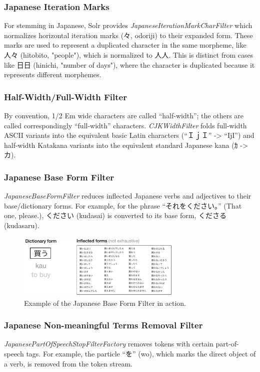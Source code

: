 \documentclass[11pt]{article}
\begin{document}
\subsubsection{Japanese Iteration Marks}
For stemming in Japanese, Solr provides \textit{JapaneseIterationMarkCharFilter} which normalizes horizontal iteration marks (々, odoriji) to their expanded form. These marks are used to represent a duplicated character in the same morpheme, like 人々 (hitobito, "people"), which is normalized to 人人. This is distinct from cases like 日日 (hinichi, "number of days"), where the character is duplicated because it represents different morphemes.

\subsubsection{Half-Width/Full-Width Filter}
By convention, 1/2 Em wide characters are called “half-width”; the others are called correspondingly “full-width” characters. \textit{CJKWidthFilter} folds full-width ASCII variants into the equivalent basic Latin characters (“ＩｊＩ” -> “IjI”) and half-width Katakana variants into the equivalent standard Japanese kana (ｶ -> カ).

\subsubsection{Japanese Base Form Filter}
\textit{JapaneseBaseFormFilter} reduces inflected Japanese verbs and adjectives to their base/dictionary forms. For example, for the phrase “それをください。” (That one, please.), ください (kudasai) is converted to its base form, くださる (kudasaru).

\begin{figure}[h!]
    \centering
    \includegraphics[width=0.7\textwidth]{image7.png}
    \caption{Example of the Japanese Base Form Filter in action.}
    \label{fig:base_form_filter}
\end{figure}

\subsubsection{Japanese Non-meaningful Terms Removal Filter}
\textit{JapanesePartOfSpeechStopFilterFactory} removes tokens with certain part-of-speech tags. For example, the particle “を” (wo), which marks the direct object of a verb, is removed from the token stream.
\end{document}
